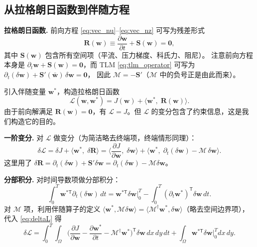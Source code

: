 \documentclass[12pt,a4paper,twoside]{article}
\begin{document}
\subsection{从拉格朗日函数到伴随方程}

\textbf{拉格朗日函数.}
前向方程 \eqref{eq:vec_nu}--\eqref{eq:vec_nz} 可写为残差形式
\begin{equation}
    \mathbf{R}(\mathbf{w}) \equiv
    \frac{\partial\mathbf{w}}{\partial t} + \mathbf{S}(\mathbf{w}) = \mathbf{0},
\end{equation}
其中 $\mathbf{S}(\mathbf{w})$ 包含所有空间项（平流、压力梯度、科氏力、阻尼）。
注意前向方程本身是 $\partial_t\mathbf{w} + \mathbf{S}(\mathbf{w}) = \mathbf{0}$，而 TLM \eqref{eq:tlm_operator} 可写为
$\partial_t(\delta\mathbf{w}) + \mathbf{S}'(\bar{\mathbf{w}})\,\delta\mathbf{w} = \mathbf{0}$，
因此 $\mathcal{M} = -\mathbf{S}'$（$\mathcal{M}$ 中的负号正是由此而来）。

引入伴随变量 $\mathbf{w}^*$，构造拉格朗日函数
\begin{equation}
    \mathcal{L}(\mathbf{w},\mathbf{w}^*)
    = J(\mathbf{w})
    + \Big\langle \mathbf{w}^*,\; \mathbf{R}(\mathbf{w}) \Big\rangle.
    \label{eq:lagrangian}
\end{equation}
由于前向解满足 $\mathbf{R}(\mathbf{w})=\mathbf{0}$，有 $\mathcal{L} = J$。但 $\mathcal{L}$ 的变分包含了约束信息，这是我们构造它的目的。

\textbf{一阶变分.}
对 $\mathcal{L}$ 做变分（为简洁略去终端项，终端情形同理）：
\begin{equation}
    \delta\mathcal{L}
    = \delta J + \Big\langle \mathbf{w}^*,\; \delta\mathbf{R} \Big\rangle
    = \Big\langle \frac{\partial J}{\partial\mathbf{w}},\; \delta\mathbf{w} \Big\rangle
      + \Big\langle \mathbf{w}^*,\; \partial_t(\delta\mathbf{w}) - \mathcal{M}\,\delta\mathbf{w} \Big\rangle.
    \label{eq:deltaL}
\end{equation}
这里用了 $\delta\mathbf{R} = \partial_t(\delta\mathbf{w}) + \mathbf{S}'\delta\mathbf{w}
= \partial_t(\delta\mathbf{w}) - \mathcal{M}\delta\mathbf{w}$。

\textbf{分部积分.}
对时间导数项做分部积分：
\[
    \int_0^T \mathbf{w}^{*\mathsf T}\partial_t(\delta\mathbf{w})\,dt
    = \mathbf{w}^{*\mathsf T}\delta\mathbf{w}\Big|_0^T
      - \int_0^T (\partial_t\mathbf{w}^*)^{\mathsf T}\delta\mathbf{w}\,dt.
\]
对 $\mathcal{M}$ 项，利用伴随算子的定义 $\langle\mathbf{w}^*,\mathcal{M}\delta\mathbf{w}\rangle
= \langle\mathcal{M}^\dagger\mathbf{w}^*,\delta\mathbf{w}\rangle$（略去空间边界项），
代入 \eqref{eq:deltaL} 得
\begin{equation}
    \delta\mathcal{L}
    = \int_0^T\!\!\int_\Omega
        \Big(\frac{\partial J}{\partial\mathbf{w}}
            - \frac{\partial\mathbf{w}^*}{\partial t}
            - \mathcal{M}^\dagger\mathbf{w}^*\Big)^{\mathsf T}\!\!\delta\mathbf{w}
        \,dx\,dy\,dt
      + \int_\Omega \mathbf{w}^{*\mathsf T}\delta\mathbf{w}\Big|_0^T dx\,dy.
    \label{eq:deltaL_ibp}
\end{equation}
\end{document}
